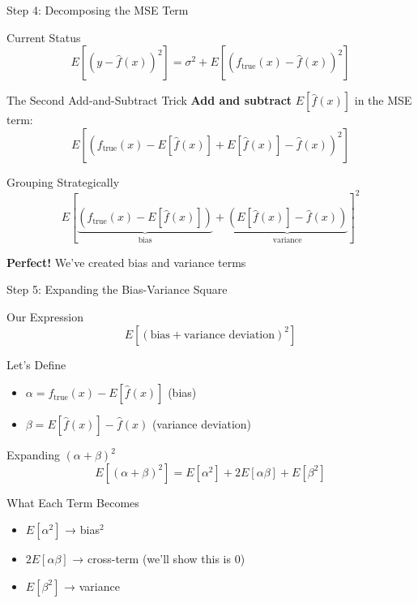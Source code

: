 \documentclass[10pt]{beamer}
\begin{document}
\begin{frame}{Step 4: Decomposing the MSE Term}
\begin{keypointsbox}{Current Status}
$$E[(y - \hat{f}(x))^2] = \sigma^2 + E[(f_{\text{true}}(x) - \hat{f}(x))^2]$$
\end{keypointsbox}

\begin{definitionbox}{The Second Add-and-Subtract Trick}
\textbf{Add and subtract } $E[\hat{f}(x)]$ in the MSE term:
$$E[(f_{\text{true}}(x) - E[\hat{f}(x)] + E[\hat{f}(x)] - \hat{f}(x))^2]$$
\end{definitionbox}

\begin{examplebox}{Grouping Strategically}
$$E[\underbrace{(f_{\text{true}}(x) - E[\hat{f}(x)])}_{\text{bias}} + \underbrace{(E[\hat{f}(x)] - \hat{f}(x))}_{\text{variance}}]^2$$
\end{examplebox}

\begin{alertbox}
\textbf{Perfect!} We've created bias and variance terms
\end{alertbox}
\end{frame}

\begin{frame}{Step 5: Expanding the Bias-Variance Square}
\begin{keypointsbox}{Our Expression}
$$E[(\text{bias} + \text{variance deviation})^2]$$
\end{keypointsbox}

\begin{definitionbox}{Let's Define}
\begin{itemize}
\item $\alpha = f_{\text{true}}(x) - E[\hat{f}(x)]$ (bias)
\item $\beta = E[\hat{f}(x)] - \hat{f}(x)$ (variance deviation)
\end{itemize}
\end{definitionbox}

\begin{examplebox}{Expanding $(\alpha + \beta)^2$}
$$E[(\alpha + \beta)^2] = E[\alpha^2] + 2E[\alpha\beta] + E[\beta^2]$$
\end{examplebox}

\begin{keypointsbox}{What Each Term Becomes}
\begin{itemize}
\item $E[\alpha^2]$ → bias$^2$
\item $2E[\alpha\beta]$ → cross-term (we'll show this is 0)
\item $E[\beta^2]$ → variance
\end{itemize}
\end{keypointsbox}
\end{frame}
\end{document}
